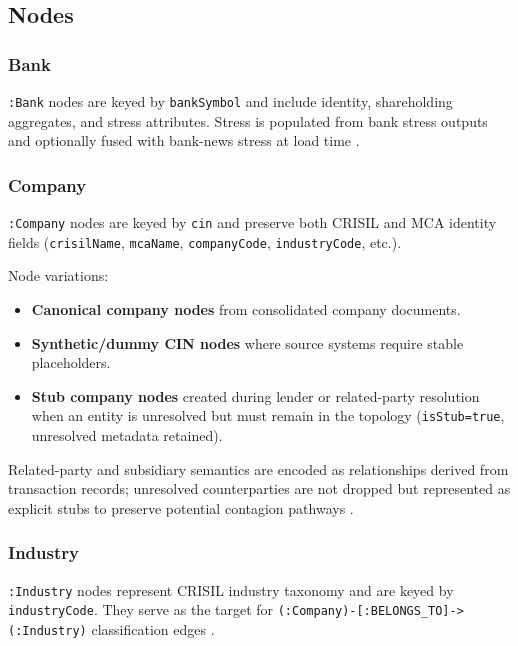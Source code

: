 \subsection{Nodes}

\subsubsection{Bank}

\texttt{:Bank} nodes are keyed by \texttt{bankSymbol} and include identity, shareholding aggregates, and stress attributes. Stress is populated from bank stress outputs and optionally fused with bank-news stress at load time \cite{ref10} \cite{ref14}.

\subsubsection{Company}

\texttt{:Company} nodes are keyed by \texttt{cin} and preserve both CRISIL and MCA identity fields (\texttt{crisilName}, \texttt{mcaName}, \texttt{companyCode}, \texttt{industryCode}, etc.).

Node variations:

\begin{itemize}
  \item \textbf{Canonical company nodes} from consolidated company documents.
  \item \textbf{Synthetic/dummy CIN nodes} where source systems require stable placeholders.
  \item \textbf{Stub company nodes} created during lender or related-party resolution when an entity is unresolved but must remain in the topology (\texttt{isStub=true}, unresolved metadata retained).
\end{itemize}

Related-party and subsidiary semantics are encoded as relationships derived from transaction records; unresolved counterparties are not dropped but represented as explicit stubs to preserve potential contagion pathways \cite{ref12} \cite{ref15} \cite{ref16}.

\subsubsection{Industry}

\texttt{:Industry} nodes represent CRISIL industry taxonomy and are keyed by \texttt{industryCode}. They serve as the target for \texttt{(:Company)-[:BELONGS\_TO]->(:Industry)} classification edges \cite{ref17} \cite{ref18}.

